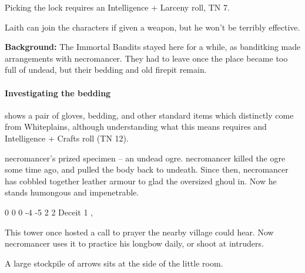Picking the lock requires an Intelligence + Larceny roll, TN 7.

Laith can join the characters if given a weapon, but he won't be terribly effective.


\textbf{Background:}
The Immortal Bandits stayed here for a while, as \gls{banditking} made arrangements with \gls{necromancer}.
They had to leave once the place became too full of undead, but their bedding and old firepit remain.

\paragraph{Investigating the bedding}
shows a pair of gloves, bedding, and other standard items which distinctly come from Whiteplains, although understanding what this means requires and Intelligence + Crafts roll (TN 12).


\Gls{necromancer}'s prized specimen -- an undead ogre.
\Gls{necromancer} killed the ogre some time ago, and pulled the body back to undeath.
Since then, \gls{necromancer} has cobbled together leather armour to glad the oversized ghoul in.
Now he stands humongous and impenetrable.


{0}%
{0}%
{{0}%
{-4}%
{-5}}%
{2}%
{2}%
{Deceit 1}%
{\greatclub, \completeleather}%
{}%


This tower once hosted a call to prayer the nearby village could hear.
Now \gls{necromancer} uses it to practice his longbow daily, or shoot at intruders.

A large stockpile of arrows sits at the side of the little room.


\thenecromancer


